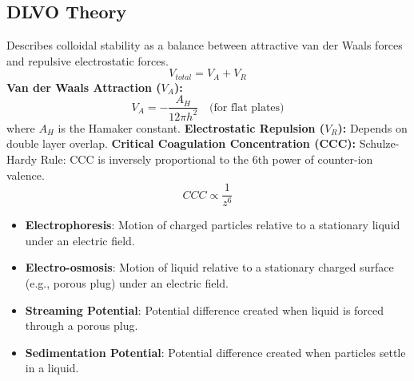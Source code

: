 \subsection{DLVO Theory}
Describes colloidal stability as a balance between attractive van der Waals forces and repulsive electrostatic forces.
\begin{equation}
    V_{total} = V_A + V_R
\end{equation}
\textbf{Van der Waals Attraction ($V_A$):}
\begin{equation}
    V_A = -\frac{A_H}{12 \pi h^2} \quad \text{(for flat plates)}
\end{equation}
where $A_H$ is the Hamaker constant.
\textbf{Electrostatic Repulsion ($V_R$):}
Depends on double layer overlap.
\textbf{Critical Coagulation Concentration (CCC):}
Schulze-Hardy Rule: CCC is inversely proportional to the 6th power of counter-ion valence.
\begin{equation}
    CCC \propto \frac{1}{z^6}
\end{equation}
\begin{itemize}
    \item \textbf{Electrophoresis}: Motion of charged particles relative to a stationary liquid under an electric field.
    \item \textbf{Electro-osmosis}: Motion of liquid relative to a stationary charged surface (e.g., porous plug) under an electric field.
    \item \textbf{Streaming Potential}: Potential difference created when liquid is forced through a porous plug.
    \item \textbf{Sedimentation Potential}: Potential difference created when particles settle in a liquid.
\end{itemize}

